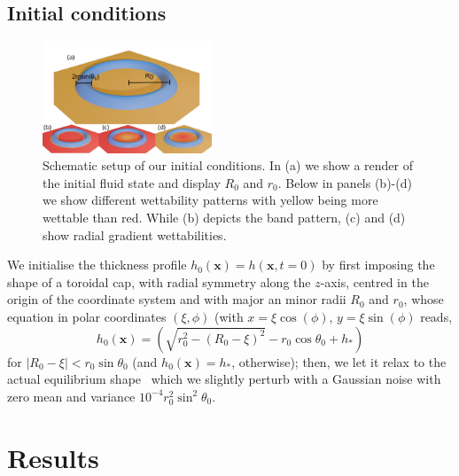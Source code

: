\documentclass[twoside,twocolumn,9pt]{article}
\begin{document}
\subsection{Initial conditions}
\begin{figure}
\centering
  \includegraphics[width=0.45\textwidth]{assets/schema_theta0.pdf}
  \caption{Schematic setup of our initial conditions. In (a) we show a render of the initial fluid state and display $R_0$ and $r_0$. 
  Below in panels (b)-(d) we show different wettability patterns with yellow being more wettable than red.
  While (b) depicts the band pattern, (c) and (d) show radial gradient wettabilities.} 
  \label{fig:ringschema}
\end{figure}

We initialise the thickness profile $h_0(\mathbf{x})=h(\mathbf{x}, t=0)$ by first imposing the shape of a toroidal cap, with radial symmetry along the $z$-axis, centred in the origin of the coordinate system and with major an minor radii $R_0$ and $r_0$, whose equation in polar coordinates $(\xi, \phi)$ (with $x = \xi \cos(\phi)$, $y=\xi \sin(\phi)$ reads,
\begin{equation}\label{eq:torus}
h_0(\mathbf{x})=\left(\sqrt{r_0^2 - \left(R_0-\xi\right)^2} - r_0\cos \theta_0 + h_{\ast}\right)
\end{equation}
for $|R_0-\xi|<r_0 \sin \theta_0$ (and $h_0(\mathbf{x})=h_{\ast}$, otherwise); then, we let it relax to the actual equilibrium shape~\cite{diezBreakupFluidRivulets2009} which we slightly perturb with a Gaussian noise with zero mean and variance $10^{-4}r_0^2 \sin^2\theta_0$. 

\section{Results} \label{sec:results}
\end{document}

